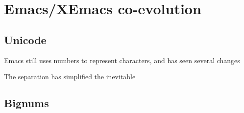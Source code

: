 \documentclass[format=acmsmall, review=false, screen=true]{acmart}
\begin{document}

\section{Emacs/XEmacs co-evolution}

\subsection{Unicode}

Emacs still uses numbers to represent characters, and has seen several changes

The separation has simplified the inevitable 

\subsection{Bignums}












\end{document}
